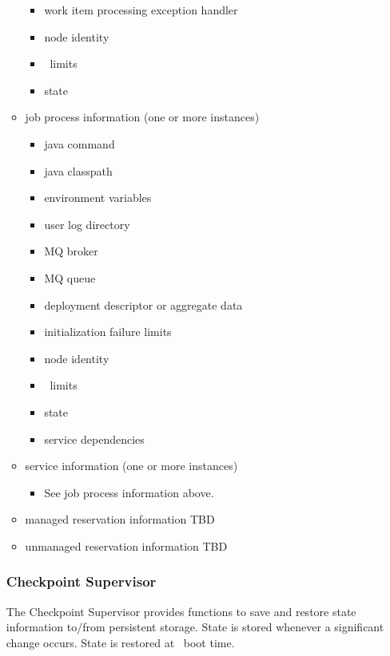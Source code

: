 \begin{itemize}
\begin{itemize}
\begin{itemize}
          \item work item processing exception handler
          \item node identity
          \item \varLinuxControlGroup~limits
          \item state
        \end{itemize} 
      \item job process information (one or more instances)
        \begin{itemize}
          \item java command
          \item java classpath
          \item environment variables
          \item user log directory
          \item MQ broker
          \item MQ queue
          \item deployment descriptor or aggregate data
          \item initialization failure limits
          \item node identity
          \item \varLinuxControlGroup~limits
          \item state
          \item service dependencies
        \end{itemize} 
      \item service information (one or more instances)
        \begin{itemize}
          \item See job process information above.
        \end{itemize} 
      \item managed reservation information
        TBD      
      \item unmanaged reservation information
        TBD          
    \end{itemize} 
    
    \subsubsection{Checkpoint Supervisor} 
    
    The Checkpoint Supervisor provides functions to save and restore state information
    to/from persistent storage. State is stored whenever a significant change occurs.
    State is restored at \varOrchestrator~boot time.
    

\end{itemize}
